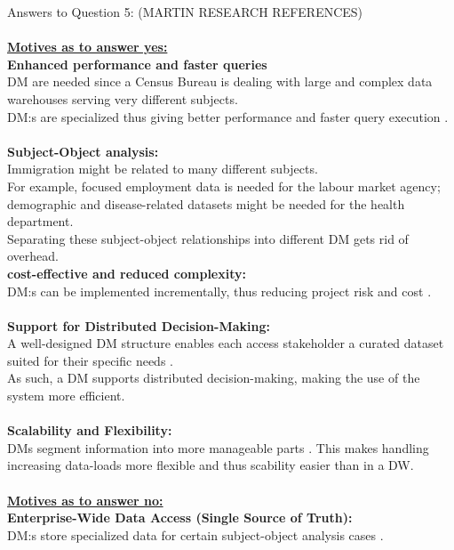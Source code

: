 \newpage Answers to Question 5: (MARTIN RESEARCH REFERENCES)\\\\
\textbf{\underline{Motives as to answer yes:}}\\
\textbf{Enhanced performance and faster queries}\\
DM are needed since a Census Bureau is dealing with large and complex data warehouses serving very different subjects.\\
DM:s are specialized thus giving better performance and faster query execution \cite[p.1242]{CourseLitt}.
\\\\
\textbf{Subject-Object analysis:}\\
Immigration might be related to many different subjects.\\
For example, focused employment data is needed for the labour market agency;\\
demographic and disease-related datasets might be needed for the health department.\\
Separating these subject-object relationships into different DM gets rid of overhead\cite[p.1243]{CourseLitt}.
\\
\textbf{cost-effective and reduced complexity:}\\
DM:s can be implemented incrementally, thus reducing project risk and cost \cite[p.1259]{CourseLitt}.
\\\\
\textbf{Support for Distributed Decision-Making:}\\
A well-designed DM structure enables each access stakeholder a curated dataset suited for their specific needs \cite[p.1243]{CourseLitt}.\\
As such, a DM supports distributed decision-making, making the use of the system more efficient.
\\\\
\textbf{Scalability and Flexibility:}\\
DMs segment information into more manageable parts \cite[p.1243]{CourseLitt}. 
This makes handling increasing data-loads more flexible and thus scability easier than in a DW.
\\\\
\textbf{\underline{Motives as to answer no:}}\\
\textbf{Enterprise-Wide Data Access (Single Source of Truth):}\\
DM:s store specialized data for certain subject-object analysis cases \cite[p.1243]{CourseLitt}. 

